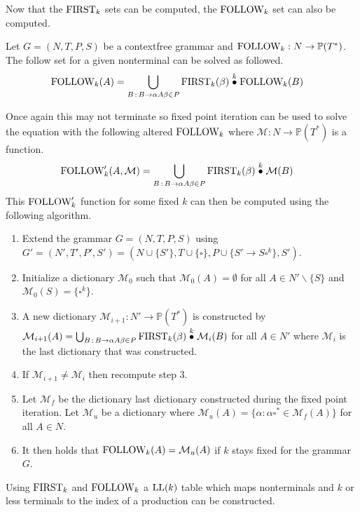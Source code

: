 Now that the $\text{FIRST}_k$ sets can be computed, the $\text{FOLLOW}_k$ set can also be computed. 
\begin{algorithm}
    \label{algorithm:follow}
    Let $G = (N, T, P, S)$ be a context\-free grammar and $\text{FOLLOW}_k: N \to \mathbb{P}(T^*)$. The follow set for a given nonterminal can be solved as followed.
    \begin{align*}
        \FOLLOW_k(A) &= \bigcup_{B \, : \, B \to \alpha A \beta \in P} \FIRST_k(\beta) \truncprod{k} \FOLLOW_k(B)
    \end{align*}
\end{algorithm}
\noindent Once again this may not terminate so fixed point iteration can be used to solve the equation with the following altered $\text{FOLLOW}_k$ where $\mathcal{M}: N \to \mathbb{P}(T^*)$ is a function.
\begin{align*}
    \FOLLOW'_k(A, \mathcal{M}) &= \bigcup_{B \,: \, B \to \alpha A \beta \in P} \FIRST_k(\beta) \truncprod{k} \mathcal{M}(B)
\end{align*}
This $\text{FOLLOW}'_k$ function for some fixed $k$ can then be computed using the following algorithm.
\begin{enumerate}
    \item Extend the grammar $G = (N, T, P, S)$ using $G' = (N', T', P', S') = (N \cup \{S'\}, T \cup \{\square\}, P \cup \{S' \to S \square^k\}, S')$.
    \item Initialize a dictionary $\mathcal{M}_0$ such that $\mathcal{M}_0(A) = \emptyset$ for all $A \in N' \backslash \{S\}$ and $\mathcal{M}_0(S) = \{\square^k\}$.
    \item A new dictionary $\mathcal{M}_{i+1}: N' \to \mathbb{P}(T^*)$ is constructed by $\mathcal{M}_{i+1}(A) = \bigcup_{B \,: \, B \to  \alpha A \beta \in P} \FIRST_k(\beta) \truncprod{k} \mathcal{M}_{i}(B)$ for all $A \in N'$ where $\mathcal{M}_{i}$ is the last dictionary that was constructed.
    \item If $\mathcal{M}_{i+1} \neq \mathcal{M}_{i}$ then recompute step 3.
    \item Let $\mathcal{M}_f$ be the dictionary last dictionary constructed during the fixed point iteration. Let $\mathcal{M}_u$ be a dictionary where $\mathcal{M}_u(A) = \{\alpha : \alpha \square^* \in \mathcal{M}_f(A)\}$ for all $A \in N$.
    \item It then holds that $\text{FOLLOW}_k(A) = \mathcal{M}_u(A)$ if $k$ stays fixed for the grammar $G$.
\end{enumerate}
Using $\text{FIRST}_k$ and $\text{FOLLOW}_k$ a $\text{LL}(k)$ table which maps nonterminals and $k$ or less terminals to the index of a production can be constructed.
